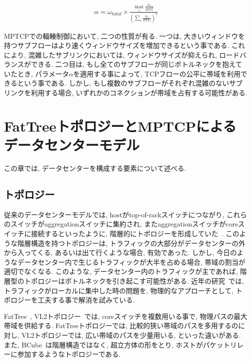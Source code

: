 \documentclass[technicalreport]{ieicej}
\begin{document}
\begin{eqnarray}
\alpha = \omega_{total} \times
\frac{\displaystyle \max_{i} \frac{w_r}{RTT^2_r}}{\displaystyle
(\sum_{r}\frac{w_r}{RTT_r})^2}
\label{alpha}
\end{eqnarray}

MPTCPでの輻輳制御において, 二つの性質が有る.
一つは, 大きいウィンドウを持つサブフローはより速くウィンドウサイズを増加できるという事である.
これにより, 混雑したサブリンクにおいては, ウィンドウサイズが抑えられ, ロードバランスができる.
二つ目は, もし全てのサブフローが同じボトルネックを抱えていたとき, パラメータ$\alpha$を適用する事によって,
TCPフローの公平に帯域を利用できるという事である.
しかし, もし複数のサブフローがそれぞれ混雑のないサブリンクを利用する場合, いずれかのコネクションが帯域を占有する可能性がある.

\section{FatTreeトポロジーとMPTCPによるデータセンターモデル}
\label{sec:fattree}
この章では, データセンターを構成する要素について述べる.
\subsection{トポロジー}
\label{subsec:topology}
従来のデータセンターモデルでは, hostがtop-of-rackスイッチにつながり,
これらのスイッチがaggregationスイッチに集約され,
またaggregationスイッチがcoreスイッチに接続するといったように, 階層的にトポロジーを形成していた~\cite{fattree}.
このような階層構造を持つトポロジーは, トラフィックの大部分がデータセンターの外から入ってくる, あるいは出て行くような場合, 有効であった.
しかし, 今日のようなデータセンター内で生じるトラフィックが大半を占める場合, 帯域の割当が適切でなくなる.
このような, データセンター内のトラフィックが主であれば, 階層型のトポロジーはボトルネックを引き起こす可能性がある.
近年の研究~\cite{fattree,bcube,vl2}では, トラフィックがローカルに集中した時の問題を, 物理的なアプローチとして,
トポロジーを工夫する事で解消を試みている.

FatTree~\cite{fattree}, VL2トポロジー~\cite{vl2}では, coreスイッチを複数用いる事で,
物理パスの最大帯域を供給する.
FatTreeトポロジーでは, 比較的狭い帯域のパスを多用するのに対し, VL2トポロジーでは, 広い帯域のパスを少量用いる, といった違いがある.
また, BCube~\cite{bcube}は階層構造ではなく, 超立方体の形をとり, ホストがパケットリレーに参加するようなトポロジーである.
\end{document}
